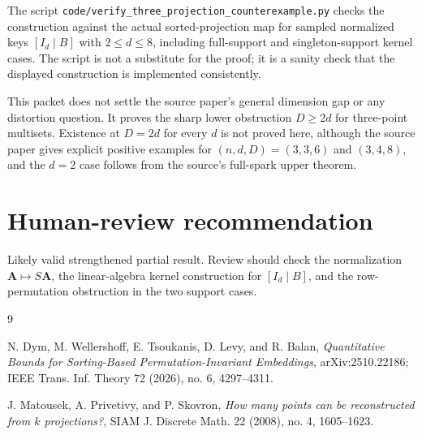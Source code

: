 \documentclass[11pt]{article}
\begin{document}
The script
\texttt{code/verify\_three\_projection\_counterexample.py} checks the
construction against the actual sorted-projection map for sampled normalized
keys \([I_d\mid B]\) with \(2\le d\le8\), including full-support and
singleton-support kernel cases.  The script is not a substitute for the
proof; it is a sanity check that the displayed construction is implemented
consistently.

This packet does not settle the source paper's general dimension gap or any
distortion question.  It proves the sharp lower obstruction \(D\ge2d\) for
three-point multisets.  Existence at \(D=2d\) for every \(d\) is not proved
here, although the source paper gives explicit positive examples for
\((n,d,D)=(3,3,6)\) and \((3,4,8)\), and the \(d=2\) case follows from the
source's full-spark upper theorem.

\section*{Human-review recommendation}

Likely valid strengthened partial result.  Review should check the
normalization \(\mathbf A\mapsto S\mathbf A\), the linear-algebra kernel
construction for \([I_d\mid B]\), and the row-permutation obstruction in the
two support cases.

\begin{thebibliography}{9}

N. Dym, M. Wellershoff, E. Tsoukanis, D. Levy, and R. Balan,
\emph{Quantitative Bounds for Sorting-Based Permutation-Invariant
Embeddings}, arXiv:2510.22186; IEEE Trans. Inf. Theory 72 (2026), no. 6,
4297--4311.

J. Matousek, A. Privetivy, and P. Skovron,
\emph{How many points can be reconstructed from \(k\) projections?},
SIAM J. Discrete Math. 22 (2008), no. 4, 1605--1623.

\end{thebibliography}
\end{document}
